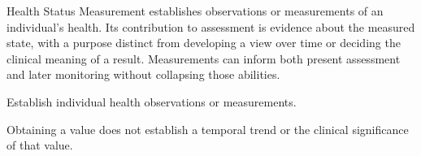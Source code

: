 Health Status Measurement establishes observations or measurements of an individual's health. Its contribution to assessment is evidence about the measured state, with a purpose distinct from developing a view over time or deciding the clinical meaning of a result. Measurements can inform both present assessment and later monitoring without collapsing those abilities.



Establish individual health observations or measurements.



Obtaining a value does not establish a temporal trend or the clinical significance of that value.


